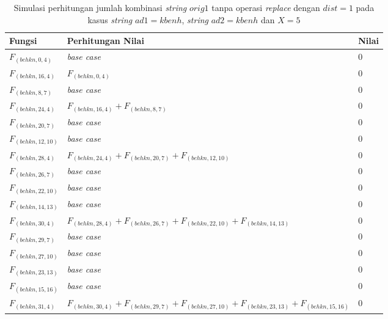 \begin{appendices}
  
  \begin{table}[H]
  	\centering
  	\begin{tabular} {|p{3cm}|p{5cm}|p{1cm}|} \hline
  		Fungsi & Perhitungan Nilai & Nilai \\ \hline
  		$ F_{(behkn, 0, 4)} $ & \textit{base case} & $ 0 $ \\ \hline
  		$ F_{(behkn, 16, 4)}  $ & $F_{(behkn, 0, 4)}$ & $ 0 $ \\ \hline
  		$ F_{(behkn, 8, 7)} $ & \textit{base case} & $ 0 $ \\ \hline
  		$ F_{(behkn, 24, 4)}  $ & $F_{(behkn, 16, 4)} + F_{(behkn, 8, 7)}$ & $ 0 $ \\ \hline
  		$ F_{(behkn, 20, 7)} $ & \textit{base case} & $ 0 $ \\ \hline
  		$ F_{(behkn, 12, 10)} $ & \textit{base case} & $ 0 $ \\ \hline
  		$ F_{(behkn, 28, 4)}  $ & $F_{(behkn, 24, 4)} + F_{(behkn, 20, 7)} + F_{(behkn, 12, 10)}$ & $ 0 $ \\ \hline
  		$ F_{(behkn, 26, 7)} $ & \textit{base case} & $ 0 $ \\ \hline
  		$ F_{(behkn, 22, 10)} $ & \textit{base case} & $ 0 $ \\ \hline
  		$ F_{(behkn, 14, 13)} $ & \textit{base case} & $ 0 $ \\ \hline
  		$ F_{(behkn, 30, 4)}  $ & $F_{(behkn, 28, 4)} + F_{(behkn, 26, 7)} + F_{(behkn, 22, 10)} + F_{(behkn, 14, 13)}$ & $ 0 $ \\ \hline
  		$ F_{(behkn, 29, 7)} $ & \textit{base case} & $ 0 $ \\ \hline
  		$ F_{(behkn, 27, 10)} $ & \textit{base case} & $ 0 $ \\ \hline
  		$ F_{(behkn, 23, 13)} $ & \textit{base case} & $ 0 $ \\ \hline
  		$ F_{(behkn, 15, 16)} $ & \textit{base case} & $ 0 $ \\ \hline
  		\rowcolor{LightCyan}
  		$ F_{(behkn, 31, 4)}  $ & $F_{(behkn, 30, 4)} + F_{(behkn, 29, 7)} + F_{(behkn, 27, 10)} + F_{(behkn, 23, 13)} + F_{(behkn, 15, 16)}$ & $ 0 $ \\ \hline
  	\end{tabular}\caption{Simulasi perhitungan jumlah kombinasi \textit{string} $ orig1 $ tanpa operasi \textit{replace} dengan $ dist= 1  $ pada kasus \textit{string} $ ad1=kbenh $, \textit{string} $ ad2=kbenh $ dan $ X=5 $}
  	\label{tab:f_3_orig1_1_1}
  \end{table}
  

\end{appendices}
